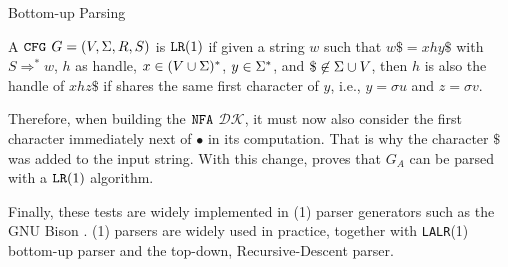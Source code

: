 \begin{section}{Bottom-up Parsing}
\begin{definition}
A $\texttt{CFG}$ $G = (V, \Sigma, R, S)$ is $\texttt{LR}(1)$ if given a string
$w$ such that $w\$ = xhy \$$ with $S \Rightarrow^* w$, $h$ as
handle, $x \in (V \cup \Sigma)^*$, $y \in \Sigma^*$, and $ \$ \not\in \Sigma \cup V$,
then $h$ is also the handle of $xhz\$ $ if shares the same first character of $y$, i.e.,
$y = \sigma u$ and $z = \sigma v$.
\end{definition}

Therefore, when building the $\texttt{NFA}$ $\mathcal{DK}$, it must now also
consider the first character immediately next of $\bullet$ in its computation.
That is why the character $\$$ was added to the input string.
With this change, \cite{sipser2012} proves that $G_A$ can be parsed with a
$\texttt{LR}(1)$ algorithm.

Finally, these tests are widely implemented in (1) parser generators
such as the GNU Bison \citep{manual21bison}. (1) parsers are widely
used in practice, together with \texttt{LALR}(1) bottom-up parser and the top-down,
Recursive-Descent parser.

\end{section}

